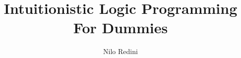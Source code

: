 \documentclass{scrartcl}
\begin{document}
\lstset{language=Prolog, basicstyle=\footnotesize}
  
\title{Intuitionistic Logic Programming For Dummies}
\author{Nilo Redini}

\maketitle







{}

\end{document}
